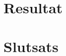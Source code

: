\documentclass[a4paper]{article}
\begin{document}
\section{Resultat}




\section{Slutsats}



\newpage


\end{document}
